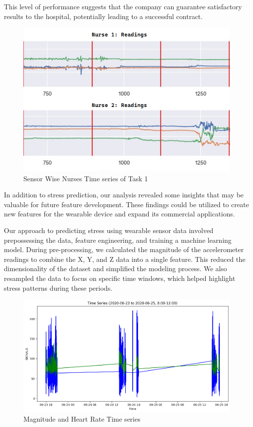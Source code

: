 \documentclass{article}
\begin{document}
This level of performance suggests that the company can guarantee satisfactory results to the hospital, potentially leading to a successful contract.
\begin{figure}
    \centering
    \includegraphics{NursesReadings.png}
    \caption{Sensor Wise Nurses Time series of Task 1}
    \label{fig:my_label}
\end{figure}

In addition to stress prediction, our analysis revealed some insights that may be valuable for future feature development. These findings could be utilized to create new features for the wearable device and expand its commercial applications.

Our approach to predicting stress using wearable sensor data involved prepossessing the data, feature engineering, and training a machine learning model. During pre-processing, we calculated the magnitude of the accelerometer readings to combine the X, Y, and Z data into a single feature. This reduced the dimensionality of the dataset and simplified the modeling process. We also resampled the data to focus on specific time windows, which helped highlight stress patterns during these periods.


\begin{figure}
    \centering
    \includegraphics[width=1\textwidth]{magnitude_HR.png}
    \caption{Magnitude and Heart Rate Time series}
    \label{fig:my_label}
\end{figure}
\end{document}
